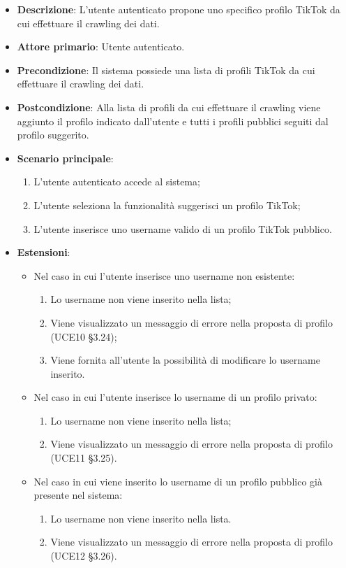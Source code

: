 \begin{itemize}
	\item \textbf{Descrizione}: L'utente autenticato propone uno specifico profilo TikTok da cui effettuare il crawling dei dati.
    \item \textbf{Attore primario}: Utente autenticato.
    \item \textbf{Precondizione}: Il sistema possiede una lista di profili TikTok da cui effettuare il crawling dei dati.
    \item \textbf{Postcondizione}: Alla lista di profili da cui effettuare il crawling viene aggiunto il profilo indicato dall’utente e tutti i profili pubblici seguiti dal profilo suggerito.
    \item \textbf{Scenario principale}: 
    \begin{enumerate}
        \item L'utente autenticato accede al sistema;
        \item L’utente seleziona la funzionalità suggerisci un profilo TikTok;
        \item L’utente inserisce uno username valido di un profilo TikTok pubblico.
    \end{enumerate}
    \item \textbf{Estensioni}:
    \begin{itemize}
        \item Nel caso in cui l’utente inserisce uno username non esistente:
        \begin{enumerate}
            \item Lo username non viene inserito nella lista;
            \item Viene visualizzato un messaggio di errore nella proposta di profilo (UCE10 §3.24);
            \item Viene fornita all’utente la possibilità di modificare lo username inserito.
        \end{enumerate}
        \item Nel caso in cui l’utente inserisce lo username di un profilo privato:
        \begin{enumerate}
            \item Lo username non viene inserito nella lista;
            \item Viene visualizzato un messaggio di errore nella proposta di profilo (UCE11 §3.25).
        \end{enumerate}
        \item Nel caso in cui viene inserito lo username di un profilo pubblico già presente nel sistema:
        \begin{enumerate}
            \item Lo username non viene inserito nella lista.
            \item Viene visualizzato un messaggio di errore nella proposta di profilo (UCE12 §3.26).
        \end{enumerate} 
    \end{itemize}
\end{itemize}

\pagebreak